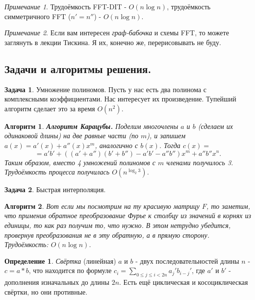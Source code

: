 \documentclass[a4paper]{article}
\theoremstyle{indented}
\newtheorem{alg}{Алгоритм}
\theoremstyle{definition}
\newtheorem{defn}{Определение}
\newtheorem{prob}{Задача}
\theoremstyle{remark}
\newtheorem{remark}{Примечание}
\begin{document}
\begin{remark}
    Трудоёмкость FFT-DIT - $O(n \log n)$, трудоёмкость симметричного FFT ($n'=n''$) - $O(n \log n)$. 
\end{remark}

\begin{remark}
    Если вам интересен \textit{граф-бабочка} и схемы FFT, то можете заглянуть в лекции Тискина. Я их, конечно же, перерисовывать не буду.
\end{remark}

\subsection{Задачи и алгоритмы решения.}

\begin{prob}
    Умножение полиномов. Пусть у нас есть два полинома с комплексными коэффициентами. Нас интересует их произведение. Тупейший алгоритм сделает это за время $O(n^2)$. 
\end{prob}

\begin{alg}
    \textbf{Алгоритм Карацубы.} Поделим многочлены $a$ и $b$ (сделаем их одинаковой длины) на две равные части (по $m$), и запишем $a(x)=a'(x)+a''(x)x^m$, аналогично с $b(x)$. Тогда $c(x)=$
    \[
        = a'b'+((a'+a'')(b'+b'')-a'b'-a''b'')x^m+a''b''x^n. 
    \]
    Таким образом, вместо 4 умножений полиномов с $m$ членами получилось 3. Трудоёмкость процесса получилась $O(n^{\log_2 3})$.  
\end{alg}

\begin{prob}
    Быстрая интерполяция.
\end{prob}

\begin{alg}
    Вот если мы посмотрим на ту красивую матрицу $F$, то заметим, что применив обратное преобразование Фурье к столбцу из значений в корнях из единицы, то как раз получим то, что нужно. В этом нетрудно убедится, провернув преобразования не в эту обратную, а в прямую сторону. Трудоёмкость: $O(n\log n)$. 
\end{alg}

\begin{defn}
    \textit{Свёртка} (линейная) $a$ и $b$ - двух последовательностей длины $n$ - $c=a*b$, что находится по формуле $c_i=\sum_{0\leq j\leq i <2n} a_j'b_{i-j}'$, где $a'$ и $b'$ - дополнения изначальных до длины $2n$. Есть ещё циклическая и косоциклическая свёртки, но они противные.
\end{defn}
\end{document}
